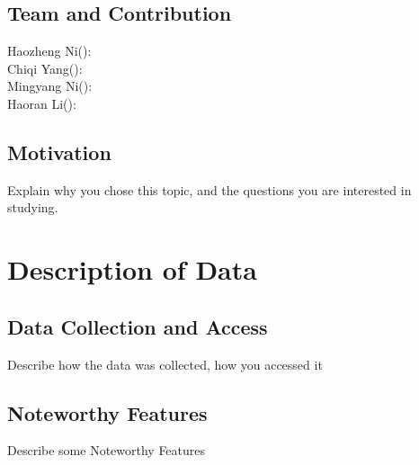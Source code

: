 \documentclass[11pt,fleqn]{book} %
\begin{document}
\section{Team and Contribution}

\vspace{1em}

	Haozheng Ni():\\
	Chiqi Yang():\\
	Mingyang Ni():\\
	Haoran Li():\\


\section{Motivation}

\vspace{1em}
	Explain why you chose this topic, and the questions you are interested in studying.




\chapter{Description of Data}

\section{Data Collection and Access}

\vspace{1em}

Describe how the data was collected, how you accessed it


\section{Noteworthy Features}

\vspace{1em}

Describe some Noteworthy Features


\end{document}
